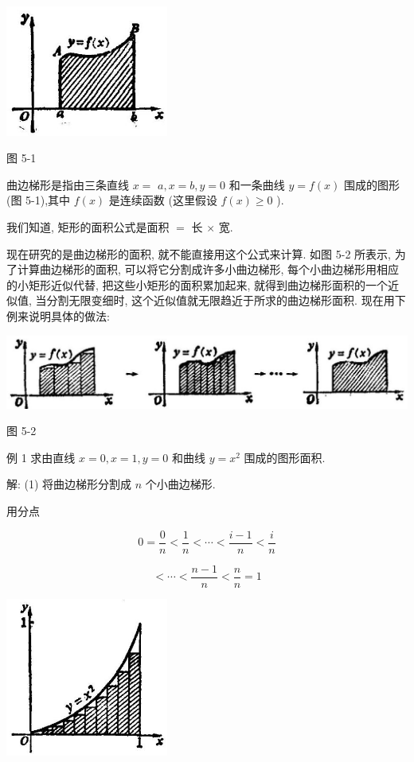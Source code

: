 \documentclass[10pt]{article}
\begin{document}
\begin{center}
\includegraphics[max width=0.4\textwidth]{images/01912c18-5c3f-733d-b775-749ba9897a9d_216_110266.jpg}
\end{center}

图 5-1

曲边梯形是指由三条直线 \(x =\) \(a,x = b,y = 0\) 和一条曲线 \(y = f\left( x\right)\) 围成的图形(图 5-1),其中 \(f\left( x\right)\) 是连续函数 (这里假设 \(f\left( x\right) \geq 0\) ).

我们知道, 矩形的面积公式是面积 \(=\) 长 \(\times\) 宽.

现在研究的是曲边梯形的面积, 就不能直接用这个公式来计算. 如图 5-2 所表示, 为了计算曲边梯形的面积, 可以将它分割成许多小曲边梯形, 每个小曲边梯形用相应的小矩形近似代替, 把这些小矩形的面积累加起来, 就得到曲边梯形面积的一个近似值, 当分割无限变细时, 这个近似值就无限趋近于所求的曲边梯形面积. 现在用下例来说明具体的做法:

\begin{center}
\includegraphics[max width=1.0\textwidth]{images/01912c18-5c3f-733d-b775-749ba9897a9d_216_513151.jpg}
\end{center}

图 5-2

例 1 求由直线 \(x = 0,x = 1,y = 0\) 和曲线 \(y = {x}^{2}\) 围成的图形面积.

解: (1) 将曲边梯形分割成 \(n\) 个小曲边梯形.

用分点

\[
0 = \frac{0}{n} < \frac{1}{n} < \cdots < \frac{i - 1}{n} < \frac{i}{n}
\]

\[
< \cdots < \frac{n - 1}{n} < \frac{n}{n} = 1
\]

\begin{center}
\includegraphics[max width=0.4\textwidth]{images/01912c18-5c3f-733d-b775-749ba9897a9d_217_504981.jpg}
\end{center}
\end{document}
